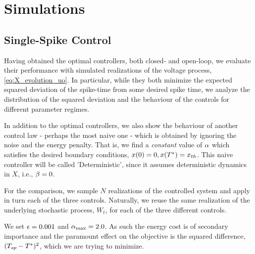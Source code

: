 
\section{Simulations} 
\subsection{Single-Spike Control}
\label{sec:probabilistic_numerical_test}
Having obtained the optimal controllers, both closed- and open-loop, we evaluate
their performance with simulated realizations of the voltage process,
\cref{eq:X_evolution_uo}. In particular, while they both minimize the expected
squared deviation of the spike-time from some desired spike time, we analyze
the distribution of the squared deviation and the behaviour of the
controls for different parameter regimes.

In addition to the optimal controllers, we also show the behaviour of
another control law - perhaps the most naive one - which is obtained by ignoring
the noise and the energy penalty. That is, we find a {\sl constant} value of
$\alpha$ which satisfies the desired boundary conditions, $x(0) = 0, x({ T^* }) = { x_{th} }$. This naive
controller will be called 'Deterministic', since it assumes deterministic
dynamics in $X$, i.e., $\beta = 0$.

For the comparison, we sample $N$ realizations of the controlled system
and apply in turn each of the three controls. Naturally, we reuse the same
realization of the underlying stochastic process, $W_t$, for each of the
three different controls.

We set ${\epsilon} = 0.001$ and ${ \alpha_{\textrm{max}} } = 2.0$. As such the energy cost is of secondary
importance and the paramount effect on the objective is the squared difference,
$(T_{sp} - { T^* })^2$, which we are trying to minimize.

